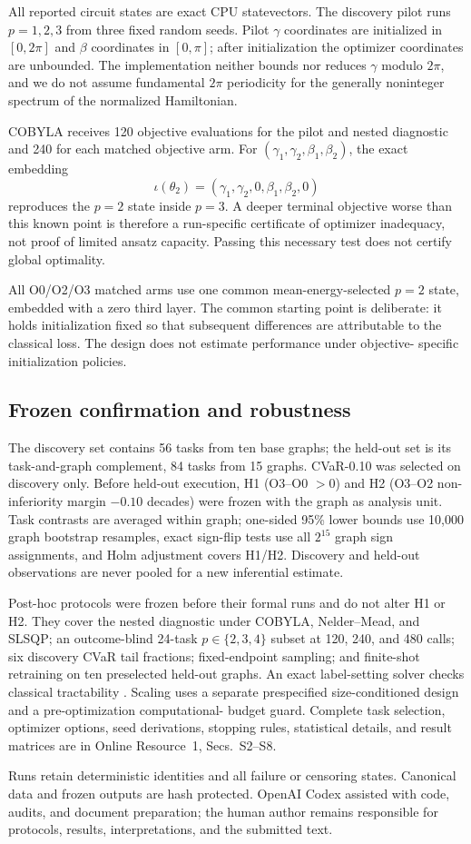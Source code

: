 All reported circuit states are exact CPU statevectors. The discovery pilot
runs $p=1,2,3$ from three fixed random seeds. Pilot $\gamma$ coordinates are
initialized in $[0,2\pi]$ and $\beta$ coordinates in $[0,\pi]$; after
initialization the optimizer coordinates are unbounded. The implementation
neither bounds nor reduces $\gamma$ modulo $2\pi$, and we do not assume
fundamental $2\pi$ periodicity for the generally noninteger spectrum of the
normalized Hamiltonian.

COBYLA receives 120 objective evaluations for the pilot and nested diagnostic
and 240 for each matched objective arm. For
$(\gamma_1,\gamma_2,\beta_1,\beta_2)$, the exact embedding
\begin{equation}
 \iota(\theta_2)=(\gamma_1,\gamma_2,0,\beta_1,\beta_2,0)
 \label{eq:embedding}
\end{equation}
reproduces the $p=2$ state inside $p=3$. A deeper terminal objective worse
than this known point is therefore a run-specific certificate of optimizer
inadequacy, not proof of limited ansatz capacity. Passing this necessary test
does not certify global optimality.

All O0/O2/O3 matched arms use one common mean-energy-selected $p=2$ state,
embedded with a zero third layer. The common starting point is deliberate: it
holds initialization fixed so that subsequent differences are attributable to
the classical loss. The design does not estimate performance under objective-
specific initialization policies.

\subsection{Frozen confirmation and robustness}

The discovery set contains 56 tasks from ten base graphs; the held-out set is
its task-and-graph complement, 84 tasks from 15 graphs. CVaR-0.10 was selected
on discovery only. Before held-out execution, H1 (O3--O0 $>0$) and H2
(O3--O2 non-inferiority margin $-0.10$ decades) were frozen with the graph as
analysis unit. Task contrasts are averaged within graph; one-sided 95\%
lower bounds use 10,000 graph bootstrap resamples, exact sign-flip tests use
all $2^{15}$ graph sign assignments, and Holm adjustment covers H1/H2.
Discovery and held-out observations are never pooled for a new inferential
estimate.

Post-hoc protocols were frozen before their formal runs and do not alter H1 or
H2. They cover the nested diagnostic under COBYLA, Nelder--Mead, and SLSQP; an
outcome-blind 24-task $p\in\{2,3,4\}$ subset at 120, 240, and 480 calls; six
discovery CVaR tail fractions; fixed-endpoint sampling; and finite-shot
retraining on ten preselected held-out graphs. An exact label-setting solver
checks classical tractability \cite{beasley1989rcsp}. Scaling uses a separate
prespecified size-conditioned design and a pre-optimization computational-
budget guard. Complete task selection, optimizer options, seed derivations,
stopping rules, statistical details, and result matrices are in Online
Resource~1, Secs.~S2--S8.

Runs retain deterministic identities and all failure or censoring states.
Canonical data and frozen outputs are hash protected. OpenAI Codex assisted
with code, audits, and document preparation; the human author remains
responsible for protocols, results, interpretations, and the submitted text.
